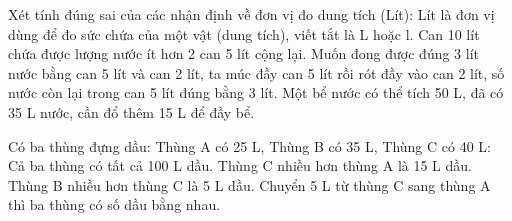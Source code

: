 \begin{ex} %
Xét tính đúng sai của các nhận định về đơn vị đo dung tích (Lít):
\choiceTF
{\True Lít là đơn vị dùng để đo sức chứa của một vật (dung tích), viết tắt là L hoặc l.}
{Can 10 lít chứa được lượng nước ít hơn 2 can 5 lít cộng lại.}
{\True Muốn đong được đúng 3 lít nước bằng can 5 lít và can 2 lít, ta múc đầy can 5 lít rồi rót đầy vào can 2 lít, số nước còn lại trong can 5 lít đúng bằng 3 lít.}
{\True Một bể nước có thể tích 50 L, đã có 35 L nước, cần đổ thêm 15 L để đầy bể.}
\end{ex}

\begin{ex} %
Có ba thùng đựng dầu: Thùng A có 25 L, Thùng B có 35 L, Thùng C có 40 L:
\choiceTF
{\True Cả ba thùng có tất cả 100 L dầu.}
{\True Thùng C nhiều hơn thùng A là 15 L dầu.}
{Thùng B nhiều hơn thùng C là 5 L dầu.}
{Chuyển 5 L từ thùng C sang thùng A thì ba thùng có số dầu bằng nhau.}
\end{ex}

